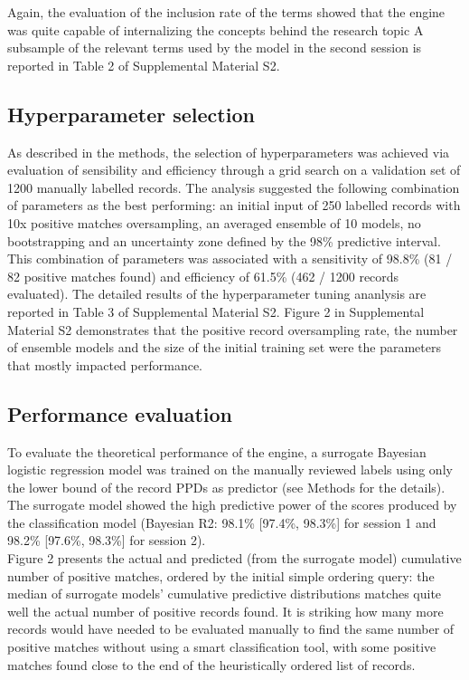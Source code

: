 \documentclass{article}
\begin{document}
Again, the evaluation of the inclusion rate of the terms showed that the
engine was quite capable of internalizing the concepts behind the
research topic A subsample of the relevant terms used by the model in
the second session is reported in Table 2 of Supplemental Material S2.

\hypertarget{hyperparameter-selection}{%
\subsection{Hyperparameter selection}\label{hyperparameter-selection}}

As described in the methods, the selection of hyperparameters was
achieved via evaluation of sensibility and efficiency through a grid
search on a validation set of 1200 manually labelled records. The
analysis suggested the following combination of parameters as the best
performing: an initial input of 250 labelled records with 10x positive
matches oversampling, an averaged ensemble of 10 models, no
bootstrapping and an uncertainty zone defined by the 98\% predictive
interval. This combination of parameters was associated with a
sensitivity of 98.8\% (81 / 82 positive matches found) and efficiency of
61.5\% (462 / 1200 records evaluated). The detailed results of the
hyperparameter tuning ananlysis are reported in Table 3 of Supplemental
Material S2. Figure 2 in Supplemental Material S2 demonstrates that the
positive record oversampling rate, the number of ensemble models and the
size of the initial training set were the parameters that mostly
impacted performance.

\hypertarget{performance-evaluation-1}{%
\subsection{Performance evaluation}\label{performance-evaluation-1}}

To evaluate the theoretical performance of the engine, a surrogate
Bayesian logistic regression model was trained on the manually reviewed
labels using only the lower bound of the record PPDs as predictor (see
Methods for the details). The surrogate model showed the high predictive
power of the scores produced by the classification model (Bayesian R2:
98.1\% {[}97.4\%, 98.3\%{]} for session 1 and 98.2\% {[}97.6\%,
98.3\%{]} for session 2).\\

Figure 2 presents the actual and predicted (from the surrogate model)
cumulative number of positive matches, ordered by the initial simple
ordering query: the median of surrogate models' cumulative predictive
distributions matches quite well the actual number of positive records
found. It is striking how many more records would have needed to be
evaluated manually to find the same number of positive matches without
using a smart classification tool, with some positive matches found
close to the end of the heuristically ordered list of records.\\
\end{document}

